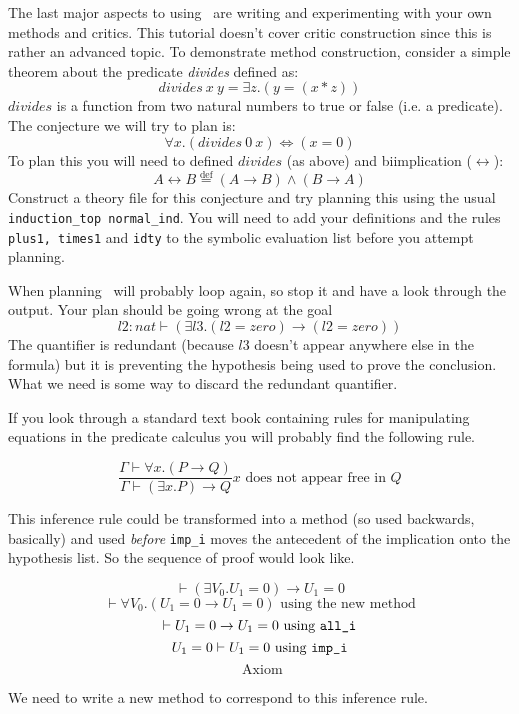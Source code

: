 The last major aspects to using \lclam\ are writing and experimenting
with your own methods and critics.  This tutorial doesn't cover critic
construction since this is rather an advanced topic.  To demonstrate
method construction, consider a simple theorem about the predicate
\emph{divides} defined as:
$$divides \: x \: y = \exists z. (y = (x * z))$$
$divides$ is a function from two natural numbers
to true or false 
(i.e. a predicate).   The conjecture we will try to plan is:
$$\forall x. (divides \: 0 \: x) \Leftrightarrow (x = 0)$$
To plan this you will need to defined $divides$ (as above) and biimplication 
($\leftrightarrow$): 
\[A \leftrightarrow B \stackrel{\mathrm{def}}{=} (A \rightarrow B)
\wedge (B \rightarrow A)\]
Construct a theory file for this conjecture and try planning this
using the usual {\tt induction\_top normal\_ind}.  You will need to
add your definitions and the rules {\tt plus1, times1} and {\tt idty}
to the symbolic evaluation list before you attempt planning.

When planning \lclam\ will probably loop again, so stop it and have a
look through the output.  Your plan should be going wrong at the goal
$$l2:nat \vdash (\exists l3. (l2 = zero) \rightarrow (l2 = zero))$$
The quantifier is redundant (because $l3$ doesn't appear anywhere
else in the formula) but it is preventing the hypothesis being used to
prove the conclusion.  What we need is some way to discard the
redundant quantifier.

If you look through a standard text book containing rules for manipulating
equations in the predicate calculus you will
probably find the 
following rule.

$$\frac{\Gamma \vdash \forall x. (P \rightarrow Q)}{\Gamma \vdash
(\exists x. P) \rightarrow Q}\mbox{$x$ does not appear free in $Q$}$$

This inference rule could be transformed into a
method (so used backwards, basically) and used {\em
  before} {\tt imp\_i} moves the antecedent of the
implication onto the hypothesis list.  So the sequence of proof would
look like.

$$\vdash (\exists V_0. U_1 = 0) \rightarrow U_1 = 0$$
$$\vdash \forall V_0. (U_1 = 0 \rightarrow U_1 = 0) \mbox{ using the
new method}$$
$$\vdash U_1 = 0 \rightarrow U_1 = 0 \mbox{ using {\tt all\_i}}$$
$$U_1 = 0 \vdash U_1 = 0 \mbox{ using {\tt imp\_i}}$$
$$\mbox{ Axiom}$$

We need to write a new method to correspond to this inference rule.

